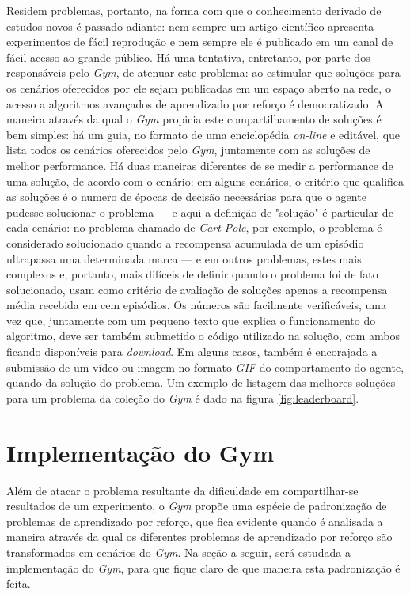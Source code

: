 \documentclass[cic,tc]{iiufrgs}
\begin{document}
Residem problemas, portanto, na forma com que o conhecimento derivado de estudos
novos é passado adiante: nem sempre um artigo científico apresenta experimentos
de fácil reprodução e nem sempre ele é publicado em um canal de fácil acesso ao
grande público. Há uma tentativa, entretanto, por parte dos responsáveis pelo
\textit{Gym}, de atenuar este problema: ao estimular que soluções para os
cenários oferecidos por ele sejam publicadas em um espaço aberto na rede, o
acesso a algoritmos avançados de aprendizado por reforço é democratizado. A
maneira através da qual o \textit{Gym} propicia este compartilhamento de
soluções é bem simples: há um guia, no formato de uma enciclopédia
\textit{on-line} e editável, que lista todos os cenários oferecidos pelo
\textit{Gym}, juntamente com as soluções de melhor performance. Há duas maneiras
diferentes de se medir a performance de uma solução, de acordo com o cenário:
em alguns cenários, o critério que qualifica as soluções é o numero de épocas de
decisão necessárias para que o agente pudesse solucionar o problema --- e aqui
a definição de "solução" é particular de cada cenário: no problema chamado de
\textit{Cart Pole}, por exemplo, o problema é considerado solucionado quando a
recompensa acumulada de um episódio ultrapassa uma determinada marca --- e em
outros problemas, estes mais complexos e, portanto, mais difíceis de definir
quando o problema foi de fato solucionado, usam como critério de avaliação de
soluções apenas a recompensa média recebida em cem episódios. Os números são
facilmente verificáveis, uma vez que, juntamente com um pequeno texto que
explica o funcionamento do algoritmo, deve ser também submetido o código
utilizado na solução, com ambos ficando disponíveis para \textit{download}. Em
alguns casos, também é encorajada a submissão de um vídeo ou imagem no formato
\textit{GIF} do comportamento do agente, quando da solução do problema. Um
exemplo de listagem das melhores soluções para um problema da coleção do
\textit{Gym} é dado na figura \ref{fig:leaderboard}.


\section{Implementação do Gym}
\label{sec:gym_implementation}

Além de atacar o problema resultante da dificuldade em compartilhar-se
resultados de um experimento, o \textit{Gym} propõe uma espécie de padronização
de problemas de aprendizado por reforço, que fica evidente quando é analisada a
maneira através da qual os diferentes problemas de aprendizado por reforço são
transformados em cenários do \textit{Gym}. Na seção a seguir, será estudada a
implementação do \textit{Gym}, para que fique claro de que maneira esta
padronização é feita.
\end{document}
